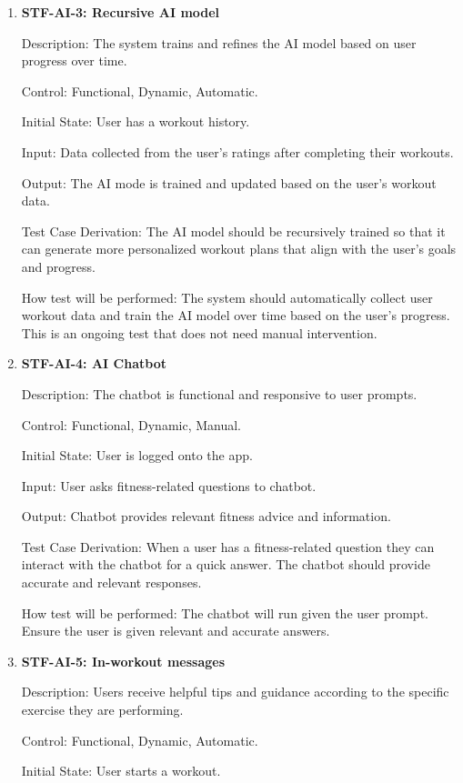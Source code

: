 \documentclass[12pt, titlepage]{article}
\begin{document}
\begin{enumerate}
\item{\textbf{STF-AI-3: Recursive AI model}\\}

Description: The system trains and refines the AI model based on user progress over time.
	
Control: Functional, Dynamic, Automatic.

Initial State: User has a workout history.

Input: Data collected from the user’s ratings after completing their workouts.

Output: The AI mode is trained and updated based on the user’s workout data.

Test Case Derivation: The AI model should be recursively trained so that it can generate more personalized workout plans that align with the user’s goals and progress.

How test will be performed: The system should automatically collect user workout data and train the AI model over time based on the user’s progress. This is an ongoing test that does not need manual intervention.

\item{\textbf{STF-AI-4: AI Chatbot}\\}

Description: The chatbot is functional and responsive to user prompts.

Control: Functional, Dynamic, Manual.

Initial State: User is logged onto the app.

Input: User asks fitness-related questions to chatbot.

Output: Chatbot provides relevant fitness advice and information.

Test Case Derivation: When a user has a fitness-related question they can interact with the chatbot for a quick answer. The chatbot should provide accurate and relevant responses. 

How test will be performed: The chatbot will run given the user prompt. Ensure the user is given relevant and accurate answers.

\item{\textbf{STF-AI-5: In-workout messages}\\}

Description: Users receive helpful tips and guidance according to the specific exercise they are performing.
	
Control: Functional, Dynamic, Automatic.

Initial State: User starts a workout.


\end{enumerate}
\end{document}
